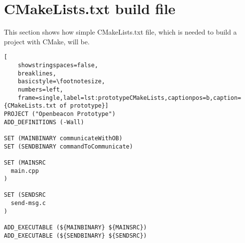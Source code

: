  \section{CMakeLists.txt build file}
  This section shows how simple CMakeLists.txt file, which is needed to build a project with CMake, will be.
  \singlespacing
  \begin{lstlisting}[
  	showstringspaces=false,
  	breaklines,
  	basicstyle=\footnotesize,
  	numbers=left,
  	frame=single,label=lst:prototypeCMakeLists,captionpos=b,caption={CMakeLists.txt of prototype}]
PROJECT ("Openbeacon Prototype")
ADD_DEFINITIONS (-Wall)

SET (MAINBINARY communicateWithOB)
SET (SENDBINARY commandToCommunicate)

SET (MAINSRC
  main.cpp
)

SET (SENDSRC
  send-msg.c
)

ADD_EXECUTABLE (${MAINBINARY} ${MAINSRC})
ADD_EXECUTABLE (${SENDBINARY} ${SENDSRC})
  \end{lstlisting}
  \onehalfspacing
